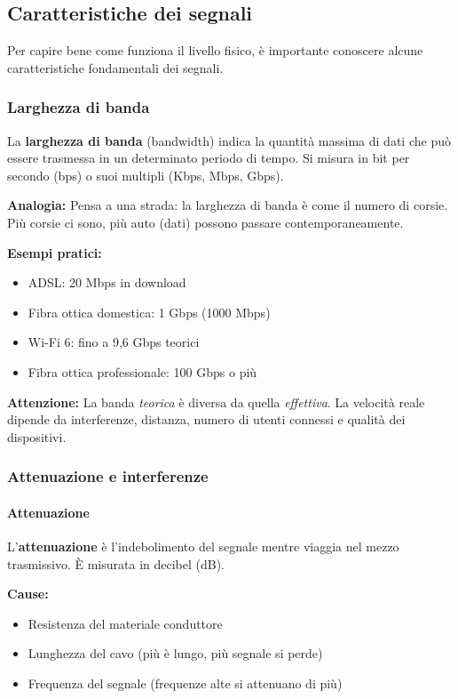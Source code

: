 \documentclass[12pt,a4paper]{article}
\begin{document}
\subsection{Caratteristiche dei segnali}

Per capire bene come funziona il livello fisico, è importante conoscere alcune caratteristiche fondamentali dei segnali.

\subsubsection{Larghezza di banda}

La \textbf{larghezza di banda} (bandwidth) indica la quantità massima di dati che può essere trasmessa in un determinato periodo di tempo. Si misura in bit per secondo (bps) o suoi multipli (Kbps, Mbps, Gbps).

\textbf{Analogia:} Pensa a una strada: la larghezza di banda è come il numero di corsie. Più corsie ci sono, più auto (dati) possono passare contemporaneamente.

\textbf{Esempi pratici:}
\begin{itemize}
    \item ADSL: 20 Mbps in download
    \item Fibra ottica domestica: 1 Gbps (1000 Mbps)
    \item Wi-Fi 6: fino a 9,6 Gbps teorici
    \item Fibra ottica professionale: 100 Gbps o più
\end{itemize}

\textbf{Attenzione:} La banda \textit{teorica} è diversa da quella \textit{effettiva}. La velocità reale dipende da interferenze, distanza, numero di utenti connessi e qualità dei dispositivi.

\subsubsection{Attenuazione e interferenze}

\paragraph{Attenuazione}
L'\textbf{attenuazione} è l'indebolimento del segnale mentre viaggia nel mezzo trasmissivo. È misurata in decibel (dB).

\textbf{Cause:}
\begin{itemize}
    \item Resistenza del materiale conduttore
    \item Lunghezza del cavo (più è lungo, più segnale si perde)
    \item Frequenza del segnale (frequenze alte si attenuano di più)
\end{itemize}
\end{document}
